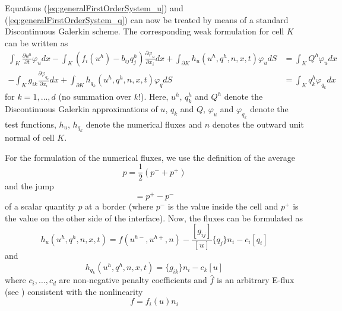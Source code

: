 Equations (\ref{eq:generalFirstOrderSystem_u}) and
(\ref{eq:generalFirstOrderSystem_q}) can now be treated by means of a standard
Discontinuous Galerkin scheme. The corresponding weak formulation for cell $K$ 
can be written as
\begin{align}
\label{eq:generalWeakFormulation_u}
	\int_K {\frac{\partial u^h}{\partial t} \varphi_u dx}
	- \int_K {(f_i(u^h) - b_{ij}q_j^h) \frac{\partial \varphi_u}{\partial x_i} dx}
	+ \int_{\partial K} {h_u(u^h, q^h, n, x, t) \varphi_u dS}
	&= \int_K {Q^h \varphi_u dx}\\
\label{eq:generalWeakFormulation_q}
	- \int_K {g_{ik} \frac{\partial \varphi_{q_k}}{\partial x_i} dx}
	+ \int_{\partial K} {h_{q_k}(u^h, q^h, n, x, t) \varphi_q dS}
	&= \int_K {q_k^h \varphi_{q_k} dx}
\end{align}
for $k = 1,\ldots,d$ (no summation over $k$!). Here, $u^h$, $q_k^h$ and $Q^h$
denote the Discontinuous Galerkin approximations of $u$, $q_k$ and $Q$,
$\varphi_u$ and $\varphi_{q_k}$ denote the test functions, $h_u$, $h_{q_k}$
denote the numerical fluxes and $n$ denotes the outward unit normal of cell
$K$.

For the formulation of the numerical fluxes, we use the definition of the 
average
\begin{equation}
	{p} = \frac{1}{2} (p^- + p^+)
\label{eq:averageOperator}
\end{equation}
and the jump
\begin{equation}
  [p] = p^+ - p^-
\label{eq:jumpOperator}
\end{equation}
of a scalar quantity $p$ at a border (where $p^-$ is the value inside the cell
and $p^+$ is the value on the other side of the interface). Now, the fluxes can
be formulated as
\begin{equation}
	h_u(u^h, q^h, n, x, t)
	= \hat{f}(u^{h-}, u^{h+}, n)
	- \frac{[g_{ij}]}{[u]} \{q_j\}n_i
	- c_i [q_i]
\label{eq:generalFlux_u}
\end{equation}
and
\begin{equation}
  h_{q_k}(u^h, q^h, n, x, t)
  = \{g_{ik}\}n_i
  - c_k[u]
\label{eq:generalFlux_q}
\end{equation}
where $c_i, \ldots, c_d$ are non-negative penalty coefficients and 
$\hat{f}$ is an arbitrary E-flux (see \cite{Osher1984}) consistent with the
nonlinearity
\begin{equation}
  f = f_i(u) n_i
\label{eq:nonlinearity}
\end{equation}
